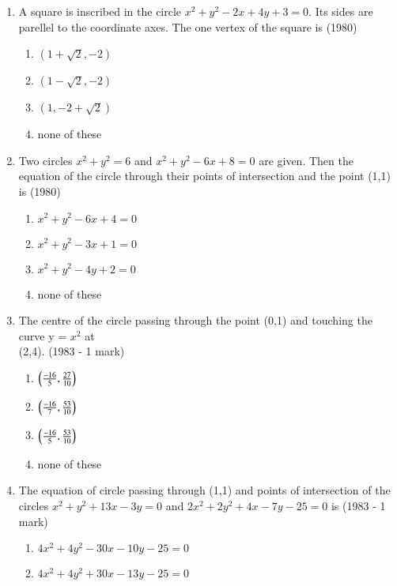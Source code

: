 \documentclass[journal,12pt,twocolumn]{IEEEtran}
\theoremstyle{remark}
\begin{document}
\begin{enumerate}
    \item A square is inscribed in the circle $x^{2} + y^{2} - 2x +4y +3= 0.$ Its sides are parellel to the coordinate axes. The one vertex of the square is \hfill {(1980)}
    \begin{multicols}{2}
    \begin{enumerate}
    \item $(1+\sqrt{2}, -2)$ 
    \item $(1-\sqrt{2}, -2)$
    \item $(1, -2 +\sqrt{2})$
    \item none of these
    \end{enumerate}
    \end{multicols}
    \item Two circles $x^{2} + y^{2} = 6$ and $x^{2} + y^{2}-6x +8=0$ are given. Then the equation of the circle through their points of intersection and the point (1,1) is \hfill {(1980)}
    \begin{enumerate}
    \item $x^{2}+y^{2}-6x+4=0$ 
    \item $x^{2}+y^{2}-3x+1=0$
    \item $x^{2}+y^{2}-4y+2=0$
    \item none of these
    \end{enumerate}
    \item The centre of the circle passing through the point (0,1) and touching the curve y = $x^{2}$ at \\ (2,4).
    \hfill {(1983 - 1 mark)}
    \begin{multicols}{2}
    \begin{enumerate}
    \item $\left(\frac{-16}{5},\frac{27}{10}\right)$
    \item $\left(\frac{-16}{7},\frac{53}{10}\right)$
    \item $\left(\frac{-16}{5},\frac{53}{10}\right)$
    \item none of these
    \end{enumerate}
    \end{multicols}
    \item The equation of circle passing through (1,1) and points of intersection of the circles $x^{2}+y^{2}+13x-3y=0$ and $2x^{2}+2y^{2}+4x-7y-25=0$ is
    \hfill {(1983 - 1 mark)}
    \begin{enumerate}
    \item $4x^{2}+4y^{2}-30x-10y-25=0$
    \item $4x^{2}+4y^{2}+30x-13y-25=0$

\end{enumerate}
\end{enumerate}
\end{document}
